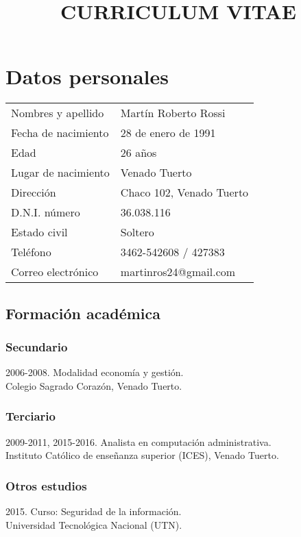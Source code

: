 \documentclass[12pt]{article}
\title{\huge{\textbf{CURRICULUM VITAE}}\vspace{-2.5ex}}
\date{}
\begin{document}
\maketitle
\section*{Datos personales}
\bgroup
\def\arraystretch{1.25}
\begin{tabular}{p{5cm} l}
  Nombres y apellido&Martín Roberto Rossi\\
  Fecha de nacimiento&28 de enero de 1991\\
  Edad&26 años\\
  Lugar de nacimiento&Venado Tuerto\\
  Dirección&Chaco 102, Venado Tuerto\\
  D.N.I. número&36.038.116\\
  Estado civil&Soltero\\
  Teléfono&3462-542608 / 427383\\
  Correo electrónico&martinros24@gmail.com\\
\end{tabular}
\setlength{\unitlength}{0.5cm}
\subsection*{Formación académica}
\subsubsection*{Secundario}
\normalsize{2006-2008. Modalidad economía y gestión.}\\\small{Colegio Sagrado Corazón, Venado Tuerto.}
\subsubsection*{Terciario}
\normalsize{2009-2011, 2015-2016. Analista en computación administrativa.}\\\small{Instituto Católico de enseñanza superior (ICES), Venado Tuerto.}
\subsubsection*{Otros estudios}
\normalsize{2015. Curso: Seguridad de la información.}\\\small{Universidad Tecnológica Nacional (UTN).}
\end{document}
